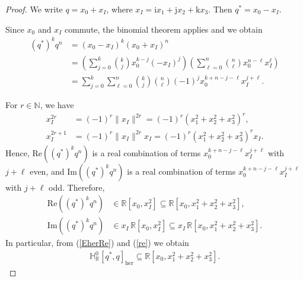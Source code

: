 \documentclass[11pt,a4paper]{amsart}
\theoremstyle{definition}
\begin{document}
\begin{proof}
We write $q=x_{0}+x_{I}$, where
$x_{I}=\mathrm{i}x_{1}+\mathrm{j}x_{2}+\mathrm{k}x_{3}$. Then
$q^{*}=x_{0}-x_{I}$.

Since $x_{0}$ and $x_{I}$ commute, the binomial theorem applies and we
obtain
%
\begin{align*}
(q^{*})^{k}q^{n} &= (x_{0}-x_{I})^{k}(x_{0}+x_{I})^{n}
\\
&=\left (\sum _{j=0}^{k}\binom{k}{j} x_{0}^{k-j}(-x_{I})^{j}\right )
\left (\sum _{\ell =0}^{n}\binom{n}{\ell} x_{0}^{n-\ell}x_{I}^{\ell}
\right )
\\
&= \sum _{j=0}^{k} \sum _{\ell =0}^{n} \binom{k}{j}\binom{n}{\ell} (-1)^{j}
x_{0}^{k+n-j-\ell} x_{I}^{j+\ell}.
\end{align*}

For $r\in \mathbb{N}$, we have
%
\begin{align*}
x_{I}^{2r}&=(-1)^{r}\|x_{I}\|^{2r} = (-1)^{r}(x_{1}^{2}+x_{2}^{2}+x_{3}^{2})^{r},
\\
x_{I}^{2r+1}&=(-1)^{r}\|x_{I}\|^{2r} x_{I} = (-1)^{r}(x_{1}^{2}+x_{2}^{2}+x_{3}^{2})^{r}
x_{I}.
\end{align*}
%
Hence, $\mathrm{Re}((q^{*})^{k}q^{n})$ is a real combination of terms
$x_{0}^{k+n-j-\ell}x_{I}^{j+\ell}$ with $j+\ell $ even, and
$\mathrm{Im}((q^{*})^{k}q^{n})$ is a real combination of terms
$x_{0}^{k+n-j-\ell}x_{I}^{j+\ell}$ with $j+\ell $ odd. Therefore,
%
\begin{align}
\label{re}
\mathrm{Re}((q^{*})^{k}q^{n}) & \in \mathbb{R}[x_{0},x_{I}^{2}]
\subseteq \mathbb{R}[x_{0},x_{1}^{2}+x_{2}^{2}+x_{3}^{2}],
\\
\mathrm{Im}((q^{*})^{k}q^{n}) & \in x_{I} \, \mathbb{R}[x_{0},x_{I}^{2}]
\subseteq x_{I} \, \mathbb{R}[x_{0},x_{1}^{2}+x_{2}^{2}+x_{3}^{2}].
\label{im}
\end{align}
%
In particular, from (\ref{EherRe}) and (\ref{re}) we obtain
%
\begin{align}
\label{hrinclusion}
\mathbb{H}^{0}_{\mathbb R}[q^{*}, q]_{\mathrm{her}} \subseteq
\mathbb{R}[x_{0},x_{1}^{2}+x_{2}^{2}+x_{3}^{2}].
\end{align}


\end{proof}
\end{document}
